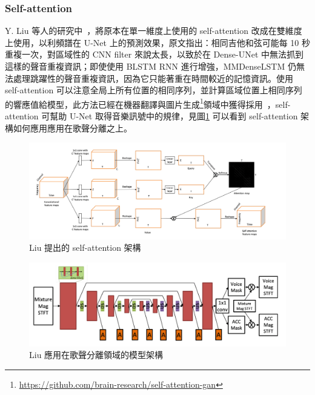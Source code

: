 \subsubsection{Self-attention}
Y. Liu 等人的研究中~\cite{liu2020voice}，將原本在單一維度上使用的 self-attention 改成在雙維度上使用，以利頻譜在 U-Net 上的預測效果，原文指出：相同吉他和弦可能每 10 秒重複一次，對區域性的 CNN filter 來說太長，以致於在 Dense-UNet 中無法抓到這樣的聲音重複資訊；即使使用 BLSTM RNN 進行增強，MMDenseLSTM 仍無法處理跳躍性的聲音重複資訊，因為它只能著重在時間較近的記憶資訊。使用 self-attention 可以注意全局上所有位置的相同序列，並計算區域位置上相同序列的響應值給模型，此方法已經在機器翻譯與圖片生成\footnote{\url{https://github.com/brain-research/self-attention-gan}}領域中獲得採用~\cite{vaswani2017attention,zhang2019self}，self-attention 可幫助 U-Net 取得音樂訊號中的規律，見圖\ref{self-attention1} 可以看到 self-attention 架構如何應用應用在歌聲分離之上。
\begin{figure}[htbp]
    \hfil
    \begin{minipage}[t]{0.80\textwidth}
        \includegraphics[width=\textwidth]{./figures/chapter02_method/self-attention1.png}
        \caption {Liu 提出的 self-attention 架構}
        \label{self-attention1}
    \end{minipage}
    \hfil
\end{figure}
\begin{figure}[htbp]
    \hfil
    \begin{minipage}[t]{0.80\textwidth}
        \includegraphics[width=\textwidth]{./figures/chapter02_method/self-attention2.png}
        \caption {Liu 應用在歌聲分離領域的模型架構}
        \label{self-attention2}
    \end{minipage}
    \hfil
\end{figure}


